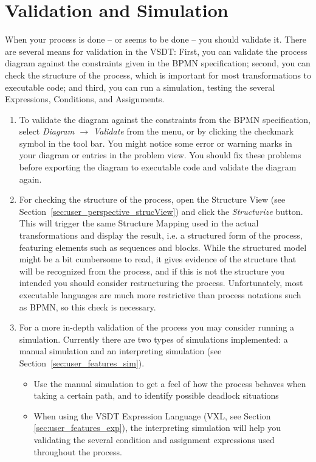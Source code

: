 
\section{Validation and Simulation}
\label{sec:user_tut_validation}

When your process is done -- or seems to be done -- you should validate it.  There
are several means for validation in the VSDT: First, you can validate the process
diagram against the constraints given in the BPMN specification; second, you can
check the structure of the process, which is important for most transformations
to executable code; and third, you can run a simulation, testing the several
Expressions, Conditions, and Assignments.

\begin{enumerate}

	\item To validate the diagram against the constraints from the BPMN
	specification, select \emph{Diagram $\rightarrow$ Validate} from the menu, or
	by clicking the checkmark symbol in the tool bar.  You might notice some error
	or warning marks in your diagram or entries in the problem view.  You should
	fix these problems before exporting the diagram to executable code and validate
	the diagram again.
	
	\item For checking the structure of the process, open the Structure View (see
	Section~\ref{sec:user_perspective_strucView}) and click the \emph{Structurize}
	button.  This will trigger the same Structure Mapping used in the actual
	transformations and display the result, i.e. a structured form of the process,
	featuring elements such as sequences and blocks.  While the structured model
	might be a bit cumbersome to read, it gives evidence of the structure that
	will be recognized from the process, and if this is not the structure you
	intended you should consider restructuring the process.  Unfortunately, most
	executable languages are much more restrictive than process notations such as
	BPMN, so this check is necessary.
	
	\item For a more in-depth validation of the process you may consider running
	a simulation.  Currently there are two types of simulations implemented: a
	manual simulation and an interpreting simulation (see
	Section~\ref{sec:user_features_sim}).
	\begin{itemize}
		\item Use the manual simulation to get a feel of how the process behaves
		when taking a certain path, and to identify possible deadlock situations
		
		\item When using the VSDT Expression Language (VXL, see Section
		\ref{sec:user_features_exp}), the interpreting simulation will help you
		validating the several condition and assignment expressions used throughout
		the process.
	\end{itemize}

\end{enumerate}


